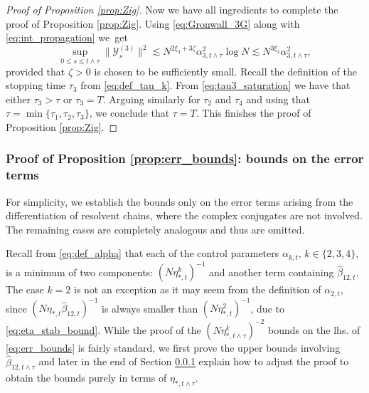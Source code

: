\documentclass[10pt]{amsart}
\numberwithin{equation}{section}
\begin{document}
\begin{proof}[Proof of Proposition \ref{prop:Zig}]
Now we have all ingredients to complete the proof of Proposition \ref{prop:Zig}. Using \eqref{eq:Gronwall_3G} along with \eqref{eq:int_propagation} we~get
\begin{equation}
\sup_{0\le s\le t\wedge \tau} \|\mathcal{Y}^{(3)}_s\|^2\lesssim N^{2\xi_3+3\zeta}\alpha^2_{3,t\wedge\tau}\log N \lesssim N^{3\xi_3}\alpha^2_{3,t\wedge\tau},
\label{eq:tau3_saturation}
\end{equation}
provided that $\zeta>0$ is chosen to be sufficiently small. Recall the definition of the stopping time $\tau_3$ from \eqref{eq:def_tau_k}. From \eqref{eq:tau3_saturation} we have that either $\tau_3>\tau$ or $\tau_3=T$. Arguing similarly for $\tau_2$ and $\tau_4$ and using that $\tau=\min\{\tau_1,\tau_2,\tau_3\}$, we conclude that $\tau=T$. This finishes the proof of Proposition \ref{prop:Zig}.
\end{proof}






\subsubsection{Proof of Proposition \ref{prop:err_bounds}: bounds on the error terms}\label{sec:err_bounds}


For simplicity, we establish the bounds only on the error terms arising from the differentiation of resolvent chains, where the complex conjugates are not involved. The remaining cases are completely analogous and thus are omitted. 

Recall from \eqref{eq:def_alpha} that each of the control parameters $\alpha_{k,t}$, $k\in\{2,3,4\}$, is a minimum of two components: $(N\eta_{*,t}^{k})^{-1}$ and another term containing $\widehat{\beta}_{12,t}$. The case $k=2$ is not an exception as it may seem from the definition of $\alpha_{2,t}$, since $(N\eta_{*,t}\widehat{\beta}_{12,t})^{-1}$ is always smaller than $(N\eta_{*,t}^2)^{-1}$, due to \eqref{eq:eta_stab_bound}. While the proof of the $(N\eta_{*,t\wedge\tau}^{k})^{-2}$ bounds on the lhs. of \eqref{eq:err_bounds} is fairly standard, we first prove the upper bounds involving $\widehat{\beta}_{12,t\wedge\tau}$ and later in the end of Section \ref{sec:err_bounds} explain how to adjust the proof to obtain the bounds purely in terms of $\eta_{*,t\wedge\tau}$.    
\end{document}
